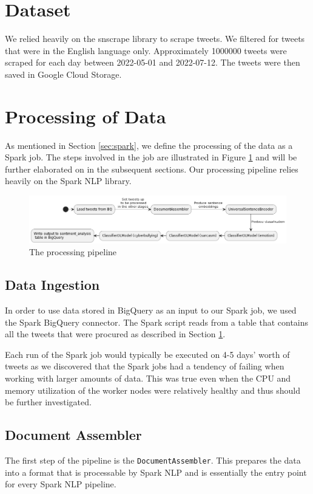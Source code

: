\documentclass[a4paper,12pt]{article}
\begin{document}
\section{Dataset}
\label{sec:dataset}
We relied heavily on the snscrape \cite{snscrape} library to scrape tweets. We filtered for tweets that were in the
English language only. Approximately 1000000 tweets were scraped for each day between 2022-05-01 and 2022-07-12. The
tweets were then saved in Google Cloud Storage.

\section{Processing of Data}
As mentioned in Section \ref{sec:spark}, we define the processing of the data as a Spark job. The steps involved in the
job are illustrated in Figure \ref{fig:data-processing-pipeline} and will be further elaborated on in the subsequent
sections. Our processing pipeline relies heavily on the Spark NLP library\cite{SparkNLP}.

\begin{figure}[h]
\centering
\includegraphics[width=\textwidth]{data-processing.png}
\caption{The processing pipeline}
\label{fig:data-processing-pipeline}
\end{figure}

\subsection{Data Ingestion}
In order to use data stored in BigQuery as an input to our Spark job, we used the Spark BigQuery
connector\cite{BigQueryconnector}. The Spark script reads from a table that contains all the tweets that were
procured as described in Section \ref{sec:dataset}.

Each run of the Spark job would typically be executed on 4-5 days' worth of tweets as we discovered that the Spark jobs
had a tendency of failing when working with larger amounts of data. This was true even when the CPU and memory
utilization of the worker nodes were relatively healthy and thus should be further investigated.

\subsection{Document Assembler}
The first step of the pipeline is the \texttt{DocumentAssembler}\cite{DocumentAssembler}. This prepares the data into
a format that is processable by Spark NLP and is essentially the entry point for every Spark NLP pipeline.
\end{document}
